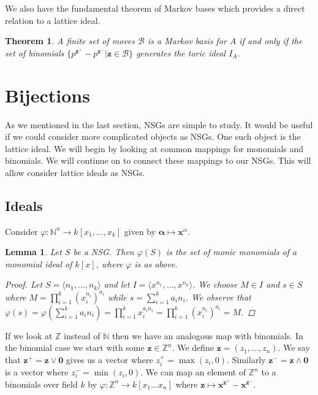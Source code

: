 \documentclass[11pt]{amsart}
\theoremstyle{plain}
\newtheorem{thm}{Theorem}
\newtheorem{lemma}{Lemma}
\theoremstyle{definition}
\begin{document}
We also have the fundamental theorem of Markov bases which provides a direct relation
to a lattice ideal.
\begin{thm}
\cite[p.~54]{aoki}
A finite set of moves $\mathcal{B}$ is a Markov basis for $A$ if and only if the set of binomials $\{p^{\mathbf{z}^+}-p^{\mathbf{z}^-}|\mathbf{z}\in \mathcal{B}\}$ generates the toric ideal $I_A$.
\end{thm}

\section{Bijections}
As we mentioned in the last section, NSGs are simple to study.
It would be useful if we could consider more complicated objects as NSGs.
One such object is the lattice ideal. We will begin by looking at common mappings for monomials and binomials. We will continue on to connect these mappings to our NSGs. This will allow consider lattice ideals as NSGs.
\subsection{Ideals}
Consider
$\varphi:\mathbb{N}^n\to k[x_1,\dots,x_k]$ given by $\mathbf{\alpha}\mapsto
\mathbf{x}^\alpha$.

\begin{lemma}
Let $S$ be a NSG.  Then $\varphi(S)$ is the set of monic
monomials of a monomial ideal of $k[x]$, where $\varphi$ is as above.
\begin{proof}
  Let $S=\langle n_1,\dots,n_k\rangle$ and let $I=\langle x^{n_1},\dots,x^{n_k}\rangle$.
  We choose $M\in I$ and $s\in S$ where
  $M=\prod\limits_{i=1}^k{\left(x_i^{n_i}\right)^{a_i}}$ while
  $s=\sum\limits_{i=1}^k{a_in_i}$.
  We observe that $\varphi(s)=\varphi(\sum\limits_{i=1}^k{a_in_i})=\prod\limits_{i=1}^k{x_i^{a_in_i}}=\prod\limits_{i=1}^k{\left(x_i^{n_i}\right)^{a_i}}=M$.
\end{proof}
\end{lemma}

If we look at $\mathbb{Z}$ instead of $\mathbb{N}$ then we have an analogous map with binomials. In the binomial case we start with some $\mathbf{z}\in \mathbb{Z}^n$.
We define $\mathbf{z}=(z_1,\dots,z_n)$.
We say that $\mathbf{z}^+=\mathbf{z}\vee\mathbf{0}$
gives us a vector where $z_i^+=\max(z_i,0)$. Similarly
$\mathbf{z^-}=\mathbf{z}\wedge \mathbf{0}$ is a vector where $z_i^-=\min(z_i,0)$.
We can map an element of $\mathbb{Z}^n$ to a binomials over field $k$ by $\varphi:\mathbb{Z}^n\to k[x_1\dots x_n]$ where $\mathbf{z}\mapsto
\mathbf{x}^{\mathbf{z}^+}-\mathbf{x}^{\mathbf{z}^-}$.
\end{document}
